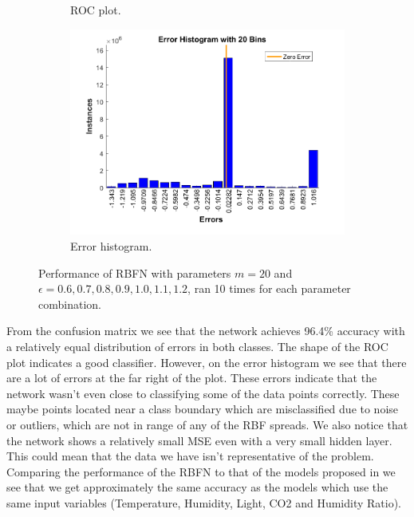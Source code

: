 \documentclass[a4paper, 11pt]{article}
\begin{document}
\begin{figure}[h!]
\begin{subfigure}[t]{0.32\textwidth}
        \caption{ROC plot.}
        \label{fig:roc}
    \end{subfigure}
    \hfill %
    \begin{subfigure}[t]{0.32\textwidth}
        \includegraphics[width=\textwidth]{../figures/final/errhist.png}
        \caption{Error histogram.}
        \label{fig:errhist}
    \end{subfigure}
    \caption{Performance of RBFN with parameters $m = 20$ and $\epsilon = 0.6,0.7, 0.8, 0.9, 1.0, 1.1, 1.2$, ran 10  times for each parameter combination.}\label{fig:accuracy}
\end{figure}


From the confusion matrix we see that the network achieves 96.4\% accuracy with a relatively equal distribution of errors in both classes. The shape of the ROC plot indicates a good classifier. However, on the error histogram we see that there are a lot of errors at the far right of the plot. These errors indicate that the network wasn't even close to classifying some of the data points correctly. These maybe points located near a class boundary which are misclassified due to noise or outliers, which are not in range of any of the RBF spreads. We also notice that the network shows a relatively small MSE even with a very small hidden layer. This could mean that the data we have isn't representative of the problem. Comparing the performance of the RBFN to that of the models proposed in \cite{Candanedo2016} we see that we get approximately the same accuracy as the models which use the same input variables (Temperature,
Humidity, Light, CO2 and Humidity Ratio).
\end{document}

